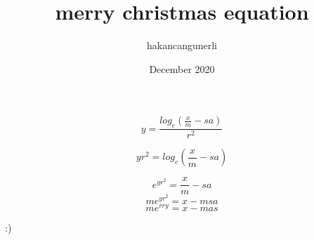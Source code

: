 \documentclass{article}
\title{merry christmas equation}
\author{hakancangunerli}
\date{December 2020}
\begin{document}
\maketitle

\begin{equation}
y= \frac {log_e(\frac{x} {m} - sa) } {r^2} 
\end{equation}

\begin{equation}
    yr^2 = log_e(\frac{x}{m} - sa)
\end{equation}
 
\begin{equation}
   e^{yr^2} = \frac{x}{m} - sa 
\end{equation}
\begin{equation}
    me^{yr^2} = x- msa
    \end{equation}
\begin{equation}
    me^{rry} = x - mas
\end{equation}
\begin{flushright}
:)
\end{flushright}
\end{document}
